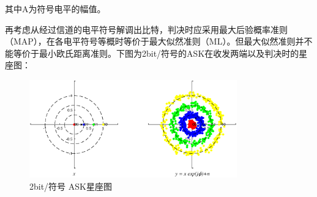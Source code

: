 \begin{table}[h]
    \centering
    \small
    \caption{2ASK、4ASK、8ASK映射关系表}
\end{table}
其中A为符号电平的幅值。

再考虑从经过信道的电平符号解调出比特，判决时应采用最大后验概率准则（MAP），在各电平符号等概时等价于最大似然准则（ML）。但最大似然准则并不能等价于最小欧氏距离准则。下图为2bit/符号的ASK在收发两端以及判决时的星座图：
\begin{figure}[h]
    \centering
    \includegraphics[width=0.8\textwidth]{pic/ASK_con.eps}
    \caption{2bit/符号 ASK星座图}
\end{figure}

